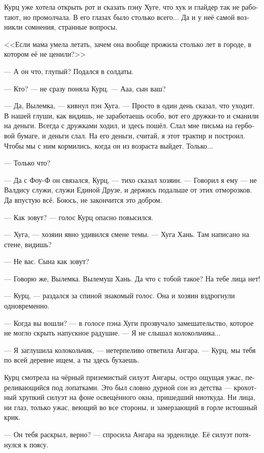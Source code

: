 \documentclass[a4paper,12pt,fleqn]{book}\usepackage{cooltooltips}\usepackage{polyglossia}\setdefaultlanguage[babelshorthands=true]{russian}\setotherlanguage{english}\defaultfontfeatures{Ligatures=TeX,Mapping=tex-text} \usepackage{xcolor}\definecolor{lightgray}{HTML}{bbbbbb}\color{lightgray}\newcommand{\ml}[3]{\textenglish{\textcolor{black}{#3}}}
\begin{document}
Курц уже хотела открыть рот и сказать пэну Хуге, что хук и глайдер так не работают, но промолчала.
В его глазах было столько всего...
Да и у неё самой возникли сомнения, странные вопросы.

<<Если мама умела летать, зачем она вообще прожила столько лет в городе, в котором её не ценили?>>

--- А он что, глупый?
Подался в солдаты.

--- Кто? --- не сразу поняла Курц.
--- Ааа, сын ваш?

--- Да, Вылемка, --- кивнул пэн Хуга.
--- Просто в один день сказал, что уходит.
В нашей глуши, как видишь, не заработаешь особо, вот его дружки-то и сманили на деньги.
Всегда с дружками ходил, и здесь пошёл.
Слал мне письма на гербовой бумаге, и деньги слал.
На его деньги, считай, я этот трактир и построил.
Чтобы мы с ним кормились, когда он из возраста выйдет.
Только...

--- Только что?

--- Да с Фоу-Ф он связался, Курц, --- тихо сказал хозяин.
--- Говорил я ему --- не Валдису служи, служи Единой Друзе, и держись подальше от этих отморозков.
Да впустую всё.
Боюсь, не закончится это добром.

--- Как зовут? --- голос Курц опасно повысился.

--- Хуга, --- хозяин явно удивился смене темы.
--- Хуга Хань.
Там написано на стене, видишь?

--- Не вас.
Сына как зовут?

--- Говорю же, Вылемка.
Вылемуш Хань.
Да что с тобой такое?
На тебе лица нет!

--- Курц, --- раздался за спиной знакомый голос.
Она и хозяин вздрогнули одновременно.

--- Когда вы вошли? --- в голосе пэна Хуги прозвучало замешательство, которое не могло скрыть напускное радушие.
--- Я не слышал колокольчика...

--- Я заглушила колокольчик, --- нетерпеливо ответила Ангара.
--- Курц, мы тебя по всей деревне ищем, а ты здесь бухаешь.

Курц смотрела на чёрный приземистый силуэт Ангары, остро ощущая ужас, переливающийся под лопатками.
Это был словно дурной сон из детства --- крохотный хрупкий силуэт на фоне освещённого окна, пришедший ниоткуда.
Ни лица, ни глаз, только ужас, веющий во все стороны, и замерзающий в горле истошный крик.

--- Он тебя раскрыл, верно? --- спросила Ангара на эрденлиде.
Её силуэт потянулся к поясу.
\end{document}
